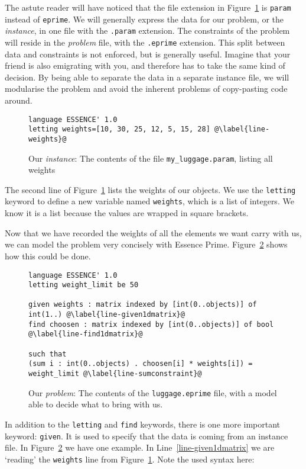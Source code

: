 The astute reader will have noticed that the file extension in
Figure~\ref{fig-knapsack1param} is \texttt{param} instead of \texttt{eprime}.
We will generally express the data for our problem, or the \emph{instance},  in
one file with the \texttt{.param} extension.  The constraints of the problem
will reside in the \emph{problem} file, with the \texttt{.eprime} extension.
This split between data and constraints is not enforced, but is generally
useful.  Imagine that your friend is also emigrating with you, and therefore
has to take the same kind of decision. By being able to separate the data in a
separate instance file, we will modularise the problem and avoid the inherent
problems of copy-pasting code around.

\begin{figure}
\begin{lstlisting}
language ESSENCE' 1.0
letting weights=[10, 30, 25, 12, 5, 15, 28] @\label{line-weights}@
\end{lstlisting}
    \caption{Our \emph{instance}: The contents of the file
    \texttt{my\_luggage.param}, listing all weights}
\label{fig-knapsack1param}
\end{figure}

The second line of Figure~\ref{fig-knapsack1param} lists the
weights of our objects. We use the \texttt{letting} keyword to define a new
variable named \texttt{weights}, which is a list of integers.  We know it
is a list because the values are wrapped in square brackets.

Now that we have recorded the weights of all the elements we want carry with us,
we can model the problem very concisely with Essence Prime. Figure~\ref{fig-knapsack1}
shows how this could be done.
\begin{figure}
\begin{lstlisting}
language ESSENCE' 1.0
letting weight_limit be 50

given weights : matrix indexed by [int(0..objects)] of int(1..) @\label{line-given1dmatrix}@
find choosen : matrix indexed by [int(0..objects)] of bool @\label{line-find1dmatrix}@

such that
(sum i : int(0..objects) . choosen[i] * weights[i]) = weight_limit @\label{line-sumconstraint}@
\end{lstlisting}
    \caption{Our \emph{problem}: The contents of the \texttt{luggage.eprime}
    file, with a model able to decide what to bring with us.}
\label{fig-knapsack1}
\end{figure}
In addition to the \texttt{letting} and \texttt{find} keywords, there is one
more important keyword: \texttt{given}. It is used to specify that the data is
coming from an instance file.  In Figure~\ref{fig-knapsack1} we have one
example. In Line~\ref{line-given1dmatrix} we are `reading' the \texttt{weights}
line from Figure~\ref{fig-knapsack1param}. Note the used syntax here:

